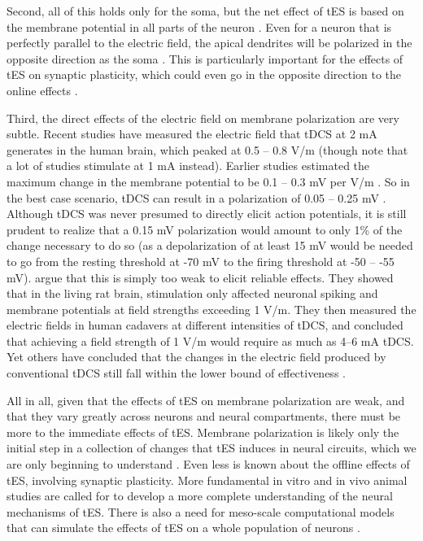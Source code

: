 \documentclass[11pt,]{memoir}
\begin{document}
Second, all of this holds only for the soma, but the net effect of tES is based on the membrane potential in all parts of the neuron \autocite{Jackson2016}. Even for a neuron that is perfectly parallel to the electric field, the apical dendrites will be polarized in the opposite direction as the soma \autocite{Bikson2019}. This is particularly important for the effects of tES on synaptic plasticity, which could even go in the opposite direction to the online effects \autocite{Kronberg2017}.

Third, the direct effects of the electric field on membrane polarization are very subtle. Recent studies have measured the electric field that tDCS at 2 mA generates in the human brain, which peaked at 0.5 \autocite{Opitz2016} -- 0.8 \autocite{Huang2017} V/m (though note that a lot of studies stimulate at 1 mA instead). Earlier studies estimated the maximum change in the membrane potential to be 0.1 \autocite{Bikson2004} -- 0.3 mV per V/m \autocite{Radman2009}. So in the best case scenario, tDCS can result in a polarization of 0.05 -- 0.25 mV \autocite{Bikson2019}. Although tDCS was never presumed to directly elicit action potentials, it is still prudent to realize that a 0.15 mV polarization would amount to only 1\% of the change necessary to do so (as a depolarization of at least 15 mV would be needed to go from the resting threshold at -70 mV to the firing threshold at -50 -- -55 mV). \textcite{Voroslakos2018} argue that this is simply too weak to elicit reliable effects. They showed that in the living rat brain, stimulation only affected neuronal spiking and membrane potentials at field strengths exceeding 1 V/m. They then measured the electric fields in human cadavers at different intensities of tDCS, and concluded that achieving a field strength of 1 V/m would require as much as 4--6 mA tDCS. Yet others have concluded that the changes in the electric field produced by conventional tDCS still fall within the lower bound of effectiveness \autocite{Huang2017}.

All in all, given that the effects of tES on membrane polarization are weak, and that they vary greatly across neurons and neural compartments, there must be more to the immediate effects of tES. Membrane polarization is likely only the initial step in a collection of changes that tES induces in neural circuits, which we are only beginning to understand \autocite{Liu2018}. Even less is known about the offline effects of tES, involving synaptic plasticity. More fundamental in vitro and in vivo animal studies are called for to develop a more complete understanding of the neural mechanisms of tES. There is also a need for meso-scale computational models that can simulate the effects of tES on a whole population of neurons \autocites{Bestmann2014}{Molaee-Ardekani2013}.
\end{document}
